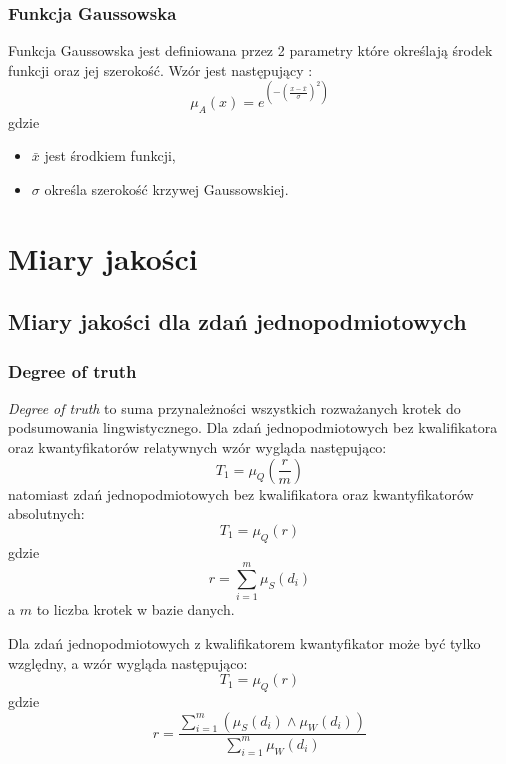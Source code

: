 \documentclass{classrep}
\begin{document}
	
	
	
	\subsubsection{Funkcja Gaussowska} 
	Funkcja Gaussowska jest definiowana przez 2 parametry które określają środek funkcji oraz jej szerokość. Wzór jest następujący \cite{kul}:
	\begin{equation}
		\mu_A(x) = e^{(-(\frac{x - \bar{x}}{\sigma})^2)}
	\end{equation}
	gdzie 
	\begin{itemize}
		\item $\bar{x}$ jest środkiem funkcji,
		\item $\sigma$ określa szerokość krzywej Gaussowskiej. 
	\end{itemize}
	
	\section{Miary jakości}
	\subsection{Miary jakości dla zdań jednopodmiotowych}
	\subsubsection{Degree of truth}
\textsl{Degree of truth} to suma przynależności wszystkich rozważanych krotek do podsumowania lingwistycznego. Dla zdań jednopodmiotowych bez kwalifikatora oraz kwantyfikatorów relatywnych wzór wygląda następująco:
	\begin{equation}
	T_1 = \mu_Q(\frac{r}{m})
	\end{equation}
natomiast zdań jednopodmiotowych bez kwalifikatora oraz kwantyfikatorów absolutnych:
	\begin{equation}
	T_1 = \mu_Q(r)
	\end{equation}
gdzie 
	\begin{equation}
r = \sum_{i=1}^{m} \mu_{S} (d_i)
	\end{equation}
a $m$ to liczba krotek w bazie danych.

Dla zdań jednopodmiotowych z kwalifikatorem kwantyfikator może być tylko względny, a wzór wygląda następująco:
\begin{equation}
T_1 = \mu_Q(r)
\end{equation}
gdzie 
\begin{equation}
r = \frac{\sum_{i=1}^{m} (\mu_{S} (d_i) \land \mu_{W} (d_i))}{\sum_{i=1}^{m} \mu_{W} (d_i)}
\end{equation}
\end{document}
